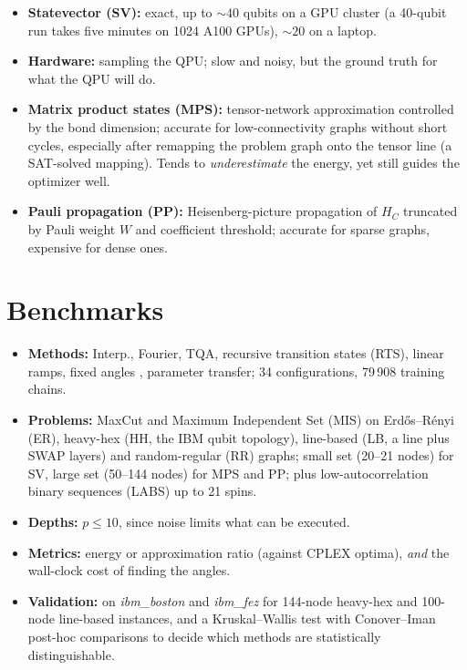 \documentclass[handoutsbeamer.tex]{subfiles}
\begin{document}
\begin{frame}
\begin{itemize}\setlength\itemsep{0.2em}
    \item \textbf{Statevector (SV):} exact, up to $\sim 40$ qubits on a GPU cluster (a 40-qubit run takes five minutes on 1024 A100 GPUs), $\sim 20$ on a laptop.
    \item \textbf{Hardware:} sampling the QPU; slow and noisy, but the ground truth for what the QPU will do.
    \item \textbf{Matrix product states (MPS):} tensor-network approximation controlled by the bond dimension; accurate for low-connectivity graphs without short cycles, especially after remapping the problem graph onto the tensor line (a SAT-solved mapping). Tends to \emph{underestimate} the energy, yet still guides the optimizer well.
    \item \textbf{Pauli propagation (PP):} Heisenberg-picture propagation of $H_C$ truncated by Pauli weight $W$ and coefficient threshold; accurate for sparse graphs, expensive for dense ones.
\end{itemize}
\end{frame}

\section{Benchmarks}

\begin{frame}
\begin{itemize}\setlength\itemsep{0.2em}
    \item \textbf{Methods:} Interp., Fourier, TQA, recursive transition states (RTS), linear ramps, fixed angles \citep{Wurtz2021}, parameter transfer; 34 configurations, 79\,908 training chains.
    \item \textbf{Problems:} MaxCut and Maximum Independent Set (MIS) on Erd\H{o}s--R\'enyi (ER), heavy-hex (HH, the IBM qubit topology), line-based (LB, a line plus SWAP layers) and random-regular (RR) graphs; small set (20--21 nodes) for SV, large set (50--144 nodes) for MPS and PP; plus low-autocorrelation binary sequences (LABS) up to 21 spins.
    \item \textbf{Depths:} $p \le 10$, since noise limits what can be executed.
    \item \textbf{Metrics:} energy or approximation ratio (against CPLEX optima), \emph{and} the wall-clock cost of finding the angles.
    \item \textbf{Validation:} on \emph{ibm\_boston} and \emph{ibm\_fez} for 144-node heavy-hex and 100-node line-based instances, and a Kruskal--Wallis test with Conover--Iman post-hoc comparisons to decide which methods are statistically distinguishable.
\end{itemize}
\end{frame}
\end{document}
